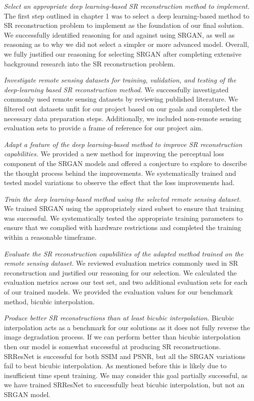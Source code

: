 \textit{Select an appropriate deep learning-based SR reconstruction method to implement.} The first step outlined in chapter 1 was to select a deep learning-based method to SR reconstruction problem to implement as the foundation of our final solution. We successfully identified reasoning for and against using SRGAN, as well as reasoning as to why we did not select a simpler or more advanced model. Overall, we fully justified our reasoning for selecting SRGAN after completing extensive background research into the SR reconstruction problem.

\textit{Investigate remote sensing datasets for training, validation, and testing of the deep-learning based SR reconstruction method.} We successfully investigated commonly used remote sensing datasets by reviewing published literature. We filtered out datasets unfit for our project based on our goals and completed the necessary data preparation steps. Additionally, we included non-remote sensing evaluation sets to provide a frame of reference for our project aim. 

\textit{Adapt a feature of the deep learning-based method to improve SR reconstruction capabilities.} We provided a new method for improving the perceptual loss component of the SRGAN models and offered a conjecture to explore to describe the thought process behind the improvements. We systematically trained and tested model variations to observe the effect that the loss improvements had.

\textit{Train the deep learning-based method using the selected remote sensing dataset.} We trained SRGAN using the appropriately sized subset to ensure that training was successful. We systematically tested the appropriate training parameters to ensure that we complied with hardware restrictions and completed the training within a reasonable timeframe.

\textit{Evaluate the SR reconstruction capabilities of the adapted method trained on the remote sensing dataset.} We reviewed evaluation metrics commonly used in SR reconstruction and justified our reasoning for our selection. We calculated the evaluation metrics across our test set, and two additional evaluation sets for each of our trained models. We provided the evaluation values for our benchmark method, bicubic interpolation.

\textit{Produce better SR reconstructions than at least bicubic interpolation.} Bicubic interpolation acts as a benchmark for our solutions as it does not fully reverse the image degradation process. If we can perform better than bicubic interpolation then our model is somewhat successful at producing SR reconstructions. SRResNet is successful for both SSIM and PSNR, but all the SRGAN variations fail to beat bicubic interpolation. As mentioned before this is likely due to insufficient time spent training. We may consider this goal partially successful, as we have trained SRResNet to successfully beat bicubic interpolation, but not an SRGAN model.

